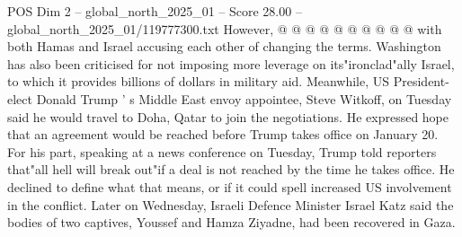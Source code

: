 \begin{textsample}{POS Dim 2 – global\_north\_2025\_01 – Score 28.00 – global\_north\_2025\_01/119777300.txt}
However, @ @ @ @ @ @ @ @ @ @ with both Hamas and Israel accusing each other of changing the terms.
Washington has also been criticised for not imposing more leverage on its"ironclad"ally Israel, to which it provides billions of dollars in military aid.
Meanwhile, US President-elect Donald Trump ' s Middle East envoy appointee, Steve Witkoff, on Tuesday said he would travel to Doha, Qatar to join the negotiations.
He expressed hope that an agreement would be reached before Trump takes office on January 20.
For his part, speaking at a news conference on Tuesday, Trump told reporters that"all hell will break out"if a deal is not reached by the time he takes office.
He declined to define what that means, or if it could spell increased US involvement in the conflict.
Later on Wednesday, Israeli Defence Minister Israel Katz said the bodies of two captives, Youssef and Hamza Ziyadne, had been recovered in Gaza.

\end{textsample}
